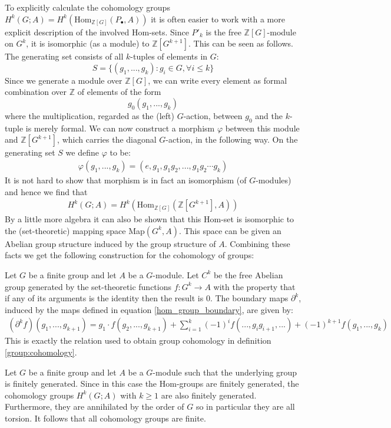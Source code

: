 	To explicitly calculate the cohomology groups $H^k(G; A) = H^k(\text{Hom}_{\mathbb{Z}[G]}(P_\bullet, A))$ it is often easier to work with a more explicit description of the involved Hom-sets. Since $P'_k$ is the free $\mathbb{Z}[G]$-module on $G^k$, it is isomorphic (as a module) to $\mathbb{Z}[G^{k+1}]$. This can be seen as follows. The generating set consists of all $k$-tuples of elements in $G$: \[S = \{(g_1, ..., g_k): g_i\in G, \forall i\leq k\}\] Since we generate a module over $\mathbb{Z}[G]$, we can write every element as formal combination over $\mathbb{Z}$ of elements of the form \[g_0(g_1, ..., g_k)\] where the multiplication, regarded as the (left) $G$-action, between $g_0$ and the $k$-tuple is merely formal. We can now construct a morphism $\varphi$ between this module and $\mathbb{Z}[G^{k+1}]$, which carries the diagonal $G$-action, in the following way. On the generating set $S$ we define $\varphi$ to be:
	\begin{gather}
		\varphi(g_1, ..., g_k) = (e, g_1, g_1g_2, ..., g_1g_2\cdots g_k)
	\end{gather}
	It is not hard to show that morphism is in fact an isomorphism (of $G$-modules) and hence we find that
	\begin{gather}
		H^k(G; A) = H^k(\text{Hom}_{\mathbb{Z}[G]}(\mathbb{Z}[G^{k+1}], A))
	\end{gather}
	By a little more algebra it can also be shown that this Hom-set is isomorphic to the (set-theoretic) mapping space Map$(G^k, A)$. This space can be given an Abelian group structure induced by the group structure of $A$. Combining these facts we get the following construction for the cohomology of groups:
	\begin{construct}
		Let $G$ be a finite group and let $A$ be a $G$-module. Let $C^k$ be the free Abelian group generated by the set-theoretic functions $f:G^k\rightarrow A$ with the property that if any of its arguments is the identity then the result is 0. The boundary maps $\partial^k$, induced by the maps defined in equation \ref{hom_group_boundary}, are given by:
		\begin{gather}
			(\partial^k f)(g_1, ..., g_{k+1}) = g_1\cdot f(g_2, ..., g_{k+1}) + \sum_{i=1}^k(-1)^if(..., g_ig_{i+1}, ...) + (-1)^{k+1}f(g_1, ..., g_k)
		\end{gather}
		This is exactly the relation used to obtain group cohomology in definition \ref{group:cohomology}.
	\end{construct}

	\begin{property}[Finiteness]
		Let $G$ be a finite group and let $A$ be a $G$-module such that the underlying group is finitely generated. Since in this case the Hom-groups are finitely generated, the cohomology groups $H^k(G; A)$ with $k\geq1$ are also finitely generated. Furthermore, they are annihilated by the order of $G$ so in particular they are all torsion. It follows that all cohomology groups are finite.
	\end{property}

